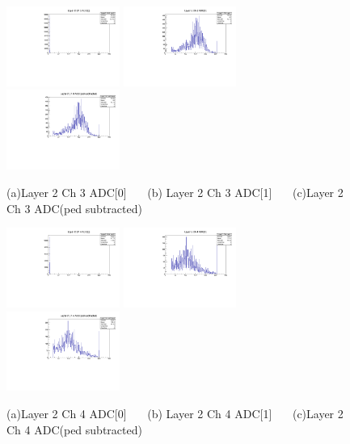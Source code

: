 \documentclass[a4paper,11pt]{article}
\theoremstyle{mytheor}
\begin{document}
\begin{figure}[H] 
\vspace*{-0.3cm} 
\includegraphics[width=0.33\textwidth,scale=0.5,trim=0 0 0 0,clip]{plotsdir/file0_muons-Layer2_Ch3_adc0-1.pdf} 
\includegraphics[width=0.33\textwidth,scale=0.5,trim=0 0 0 0,clip]{plotsdir/file0_muons-Layer2_Ch3_adc1-1.pdf} 
\includegraphics[width=0.33\textwidth,scale=0.5,trim=0 0 0 0,clip]{plotsdir/file0_muons-Layer2_Ch3_adcPedsub-1.pdf} 
\caption{(a)Layer 2 Ch 3 ADC[0] ~~~(b) Layer 2 Ch 3 ADC[1] ~~~(c)Layer 2 Ch 3 ADC(ped subtracted) } 
\end{figure} 
\begin{figure}[H] 
\vspace*{-0.3cm} 
\includegraphics[width=0.33\textwidth,scale=0.5,trim=0 0 0 0,clip]{plotsdir/file0_muons-Layer2_Ch4_adc0-1.pdf} 
\includegraphics[width=0.33\textwidth,scale=0.5,trim=0 0 0 0,clip]{plotsdir/file0_muons-Layer2_Ch4_adc1-1.pdf} 
\includegraphics[width=0.33\textwidth,scale=0.5,trim=0 0 0 0,clip]{plotsdir/file0_muons-Layer2_Ch4_adcPedsub-1.pdf} 
\caption{(a)Layer 2 Ch 4 ADC[0] ~~~(b) Layer 2 Ch 4 ADC[1] ~~~(c)Layer 2 Ch 4 ADC(ped subtracted) } 
\end{figure} 
\end{document}
